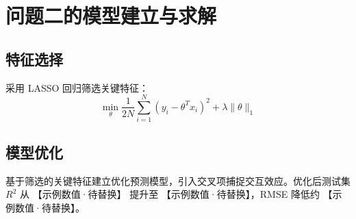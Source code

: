 \section{问题二的模型建立与求解}

\subsection{特征选择}

采用 LASSO 回归筛选关键特征：
\[
  \min_{\theta} \frac{1}{2N} \sum_{i=1}^{N} (y_i - \theta^T x_i)^2 + \lambda \|\theta\|_1
\]

\subsection{模型优化}

基于筛选的关键特征建立优化预测模型，引入交叉项捕捉交互效应。优化后测试集 $R^2$ 从 【示例数值·待替换】 提升至 【示例数值·待替换】，RMSE 降低约 【示例数值·待替换】。
